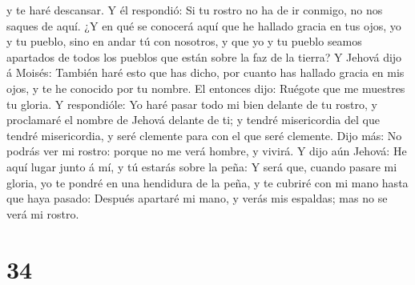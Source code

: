 y te haré descansar.  Y él respondió: Si tu rostro no ha de
ir conmigo, no nos saques de aquí.  ¿Y en qué se conocerá
aquí que he hallado gracia en tus ojos, yo y tu pueblo, sino en andar tú
con nosotros, y que yo y tu pueblo seamos apartados de todos los pueblos
que están sobre la faz de la tierra?  Y Jehová dijo á
Moisés: También haré esto que has dicho, por cuanto has hallado gracia
en mis ojos, y te he conocido por tu nombre.  El entonces
dijo: Ruégote que me muestres tu gloria.  Y respondióle: Yo
haré pasar todo mi bien delante de tu rostro, y proclamaré el nombre de
Jehová delante de ti; y tendré misericordia del que tendré misericordia,
y seré clemente para con el que seré clemente.  Dijo más:
No podrás ver mi rostro: porque no me verá hombre, y vivirá.
 Y dijo aún Jehová: He aquí lugar junto á mí, y tú estarás
sobre la peña:  Y será que, cuando pasare mi gloria, yo te
pondré en una hendidura de la peña, y te cubriré con mi mano hasta que
haya pasado:  Después apartaré mi mano, y verás mis
espaldas; mas no se verá mi rostro.

\hypertarget{section-33}{%
\section{34}\label{section-33}}

